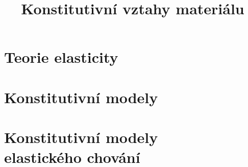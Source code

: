 \documentclass[a4paper, 10pt, oneside, draft]{report}
\numberwithin{equation}{part}
\begin{document}
\begin{titlepage}
\pagecolor{fsimodra}
\color{white}
\title{Konstitutivní vztahy materiálu}
\maketitle
\nopagecolor
\color{black}
\end{titlepage}


\chapter{Teorie elasticity}


















%

\chapter{Konstitutivní modely}









\chapter{Konstitutivní modely\\elastického chování}


















\end{document}
